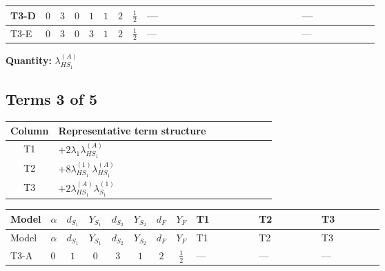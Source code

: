 \documentclass[8pt]{article}
\begin{document}
\begin{landscape}
\begin{longtable}{@{}llcccccc >{\raggedright\arraybackslash}p{0.21\linewidth} >{\raggedright\arraybackslash}p{0.21\linewidth} >{\raggedright\arraybackslash}p{0.21\linewidth}@{}}
\midrule
T3-D & $0$ & $3$ & $0$ & $1$ & $1$ & $2$ & $\frac{1}{2}$ & --- & \scriptsize\adjustbox{max width=\linewidth}{$\begin{gathered} -\frac{3 {g_1}^2 {\lambda_{HS_1}^{(A)}}}{2}\end{gathered}$} & --- \\
\midrule
T3-E & $0$ & $3$ & $0$ & $3$ & $1$ & $2$ & $\frac{1}{2}$ & --- & \scriptsize\adjustbox{max width=\linewidth}{$\begin{gathered} -\frac{3 {g_1}^2 {\lambda_{HS_1}^{(A)}}}{2}\end{gathered}$} & --- \\
\midrule
\bottomrule
\end{longtable}
\clearpage
\noindent\textbf{Quantity: }$\lambda_{HS_1}^{(A)}$\par\smallskip
\subsection*{Terms 3 of 5}
\begin{center}
\begin{tabular}{@{}c >{\raggedright\arraybackslash}p{0.82\linewidth}@{}}
\toprule
Column & Representative term structure \\
\midrule
T1 & \(\displaystyle +2 {\lambda_1} {\lambda_{HS_1}^{(A)}}\) \\
\midrule
T2 & \(\displaystyle +8 {\lambda_{HS_1}^{(1)}} {\lambda_{HS_1}^{(A)}}\) \\
\midrule
T3 & \(\displaystyle +2 {\lambda_{HS_1}^{(A)}} {\lambda_{S_1}^{(1)}}\) \\
\midrule
\bottomrule
\end{tabular}
\end{center}
\smallskip
\tiny
\begin{longtable}{@{}llcccccc >{\raggedright\arraybackslash}p{0.21\linewidth} >{\raggedright\arraybackslash}p{0.21\linewidth} >{\raggedright\arraybackslash}p{0.21\linewidth}@{}}
\toprule
Model & $\alpha$ & $d_{S_1}$ & $Y_{S_1}$ & $d_{S_2}$ & $Y_{S_2}$ & $d_F$ & $Y_F$ & T1 & T2 & T3 \\
\midrule
\endfirsthead
\toprule
Model & $\alpha$ & $d_{S_1}$ & $Y_{S_1}$ & $d_{S_2}$ & $Y_{S_2}$ & $d_F$ & $Y_F$ & T1 & T2 & T3 \\
\midrule
\endhead
T3-A & $0$ & $1$ & $0$ & $3$ & $1$ & $2$ & $\frac{1}{2}$ & --- & --- & --- \\
\midrule

\end{longtable}
\end{landscape}
\end{document}

